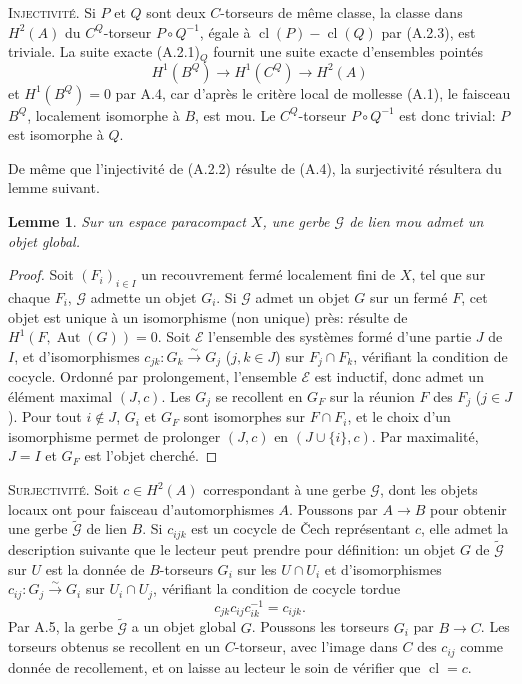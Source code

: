 \documentclass[11pt,a4paper]{article}
\theoremstyle{plain}
\newtheorem{lemma}[theorem]{Lemme}
\theoremstyle{definition}
\DeclareMathOperator{\Aut}{Aut}
\DeclareMathOperator{\cl}{cl}
\newcommand{\iso}{\xrightarrow{\sim}}
\begin{document}
\noindent \textsc{Injectivit\'e.} Si $P$ et $Q$ sont deux $C$-torseurs de m\^eme classe, la classe dans $H^{2}(A)$
du $C^{Q}$-torseur $P \circ Q^{-1}$, \'egale \`a $\cl(P) - \cl(Q)$ par (A.2.3), est triviale. La suite
exacte (A.2.1)$_{Q}$ fournit une suite exacte d'ensembles point\'es
\[
H^{1}(B^{Q}) \longrightarrow H^{1}(C^{Q}) \longrightarrow H^{2}(A)
\]
et $H^{1}(B^{Q}) = 0$ par A.4, car d'apr\`es le crit\`ere local de mollesse (A.1), le faisceau $B^{Q}$, localement isomorphe \`a $B$, est mou. Le $C^{Q}$-torseur $P \circ Q^{-1}$ est donc trivial: $P$
est isomorphe \`a $Q$.

De m\^eme que l'injectivit\'e de (A.2.2) r\'esulte de (A.4), la surjectivit\'e r\'esultera
du lemme suivant.

\begin{lemma}
Sur un espace paracompact $X$, une gerbe $\mathcal{G}$ de lien mou admet un objet global.
\end{lemma}

\begin{proof}
Soit $(F_{i})_{i \in I}$ un recouvrement ferm\'e localement fini de $X$, tel que sur chaque
$F_{i}$, $\mathcal{G}$ admette un objet $G_{i}$. Si $\mathcal{G}$ admet un objet $G$ sur un ferm\'e $F$, cet objet
est unique \`a un isomorphisme (non unique) pr\`es: r\'esulte de $H^{1}(F, \Aut(G)) = 0$.
Soit $\mathcal{E}$ l'ensemble des syst\`emes form\'e d'une partie $J$ de $I$, et d'isomorphismes
$c_{jk}: G_{k} \iso G_{j}$ ($j,k \in J$) sur $F_{j} \cap F_{k}$, v\'erifiant la condition de cocycle. Ordonn\'e par
prolongement, l'ensemble $\mathcal{E}$ est inductif, donc admet un \'el\'ement maximal $(J, c)$.
Les $G_{j}$ se recollent en $G_{F}$ sur la r\'eunion $F$ des $F_{j}$ ($j \in J$). Pour tout $i \notin J$, $G_{i}$ et $G_{F}$ sont isomorphes sur $F \cap F_{i}$, et le choix d'un isomorphisme permet de prolonger $(J, c)$ en $(J \cup \{i\}, c)$. Par maximalit\'e, $J = I$ et $G_{F}$ est l'objet cherch\'e.
\end{proof}

\noindent \textsc{Surjectivit\'e.} Soit $c \in H^{2}(A)$ correspondant \`a une gerbe $\mathcal{G}$, dont les objets
locaux ont pour faisceau d'automorphismes $A$. Poussons par $A \to B$ pour obtenir
une gerbe $\widetilde{\mathcal{G}}$ de lien $B$. Si $c_{ijk}$ est un cocycle de \v{C}ech repr\'esentant $c$, elle admet la
description suivante que le lecteur peut prendre pour d\'efinition: un objet $G$ de $\widetilde{\mathcal{G}}$ sur
$U$ est la donn\'ee de $B$-torseurs $G_{i}$ sur les $U \cap U_{i}$ et d'isomorphismes $c_{ij}: G_{j} \iso G_{i}$
sur $U_{i} \cap U_{j}$, v\'erifiant la condition de cocycle tordue
\[
c_{jk} c_{ij} c_{ik}^{-1} = c_{ijk}.
\]
Par A.5, la gerbe $\widetilde{\mathcal{G}}$ a un objet global $G$. Poussons les torseurs $G_{i}$ par $B \to C$.
Les torseurs obtenus se recollent en un $C$-torseur, avec l'image dans $C$ des
$c_{ij}$ comme donn\'ee de recollement, et on laisse au lecteur le soin de v\'erifier que $\cl = c$.
\end{document}
